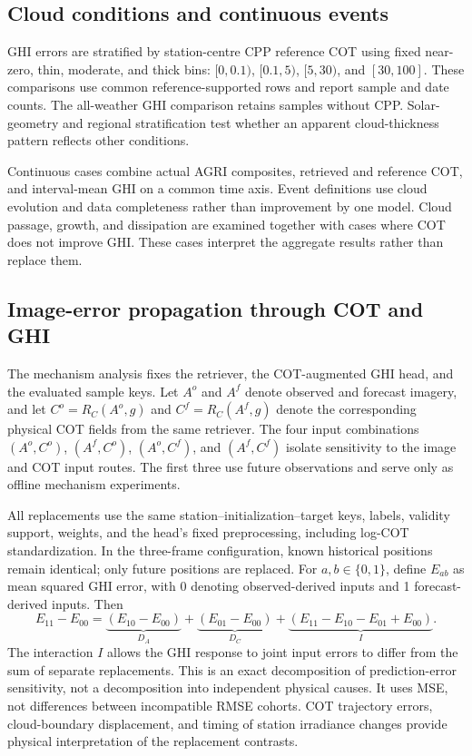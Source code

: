 \documentclass[11pt]{article}
\begin{document}
\subsection{Cloud conditions and continuous events}
GHI errors are stratified by station-centre CPP reference COT using fixed near-zero, thin, moderate, and thick bins: $[0,0.1)$, $[0.1,5)$, $[5,30)$, and $[30,100]$. These comparisons use common reference-supported rows and report sample and date counts. The all-weather GHI comparison retains samples without CPP. Solar-geometry and regional stratification test whether an apparent cloud-thickness pattern reflects other conditions.

Continuous cases combine actual AGRI composites, retrieved and reference COT, and interval-mean GHI on a common time axis. Event definitions use cloud evolution and data completeness rather than improvement by one model. Cloud passage, growth, and dissipation are examined together with cases where COT does not improve GHI. These cases interpret the aggregate results rather than replace them.

\subsection{Image-error propagation through COT and GHI}
The mechanism analysis fixes the retriever, the COT-augmented GHI head, and the evaluated sample keys. Let $A^o$ and $A^f$ denote observed and forecast imagery, and let $C^o=R_C(A^o,g)$ and $C^f=R_C(A^f,g)$ denote the corresponding physical COT fields from the same retriever. The four input combinations $(A^o,C^o)$, $(A^f,C^o)$, $(A^o,C^f)$, and $(A^f,C^f)$ isolate sensitivity to the image and COT input routes. The first three use future observations and serve only as offline mechanism experiments.

All replacements use the same station--initialization--target keys, labels, validity support, weights, and the head's fixed preprocessing, including log-COT standardization. In the three-frame configuration, known historical positions remain identical; only future positions are replaced. For $a,b\in\{0,1\}$, define $E_{ab}$ as mean squared GHI error, with 0 denoting observed-derived inputs and 1 forecast-derived inputs. Then
\begin{equation}
E_{11}-E_{00}=\underbrace{(E_{10}-E_{00})}_{D_A}
+\underbrace{(E_{01}-E_{00})}_{D_C}
+\underbrace{(E_{11}-E_{10}-E_{01}+E_{00})}_{I}.
\label{eq:propagation}
\end{equation}
The interaction $I$ allows the GHI response to joint input errors to differ from the sum of separate replacements. This is an exact decomposition of prediction-error sensitivity, not a decomposition into independent physical causes. It uses MSE, not differences between incompatible RMSE cohorts. COT trajectory errors, cloud-boundary displacement, and timing of station irradiance changes provide physical interpretation of the replacement contrasts.
\end{document}
